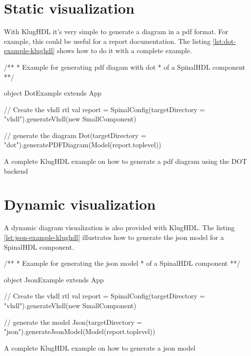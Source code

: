 \section{Static visualization}
\label{sec:static-visualization}

With KlugHDL it's very simple to generate a diagram in a pdf format. For example, this could be
useful for a report documentation. The listing \ref{lst:dot-example-klughdl}
shows how to do it with a complete example.

\begin{listing}[H]
  \centering
  \begin{scalacode}
  /**
   * Example for generating pdf diagam with dot
   * of a SpinalHDL component
  **/
   
   object DotExample extends App {

    // Create the vhdl rtl
    val report = SpinalConfig(targetDirectory = "vhdl").generateVhdl(new SmallComponent)

    // generate the diagram
    Dot(targetDirectory = "dot").generatePDFDiagram(Model(report.toplevel))
  }
  \end{scalacode}
  \caption[KlugHDL example on how to generate a pdf diagram]{A complete KlugHDL
    example on how to generate a pdf diagram using the DOT backend}
  \label{lst:dot-example-klughdl}
\end{listing}

\section{Dynamic visualization}
\label{sec:dynamic-visualization}

A dynamic diagram visualization is also provided with KlugHDL. The listing
\ref{lst:json-example-klughdl} illustrates how to generate the json model for a
SpinalHDL component.

\begin{listing}[H]
  \centering
  \begin{scalacode}
  /**
   * Example for generating the json model
   * of a SpinalHDL component
   **/

   object JsonExample extends App {
     
     // Create the vhdl rtl
    val report = SpinalConfig(targetDirectory = "vhdl").generateVhdl(new SmallComponent)

     // generate the model
     Json(targetDirectory = "json").generateJsonModel(Model(report.toplevel))
   }
  \end{scalacode}
  \caption[KlugHDL example on how to generate a json model]{A complete KlugHDL
    example on how to generate a json model}
  \label{lst:json-example-klughdl}
\end{listing}

